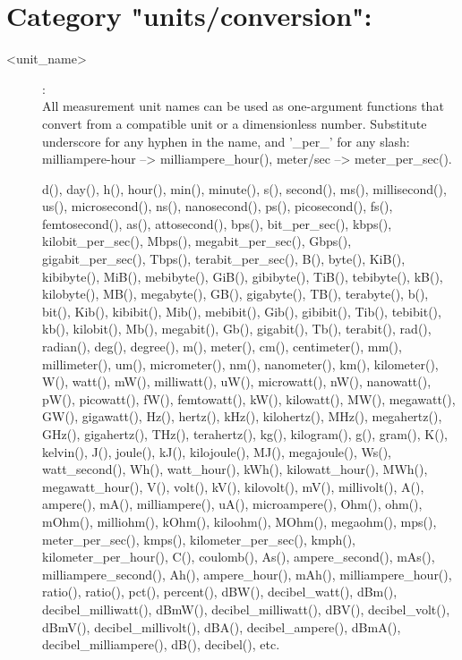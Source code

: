\section{Category "units/conversion":}
\label{sec:ned-functions:category-units-conversion}

\begin{description}
\item[<unit\_name>]:  \\
    All measurement unit names can be used as one-argument functions that
    convert from a compatible unit or a dimensionless number. Substitute
    underscore for any hyphen in the name, and '\_per\_' for any slash:
    milliampere-hour --> milliampere\_hour(), meter/sec --> meter\_per\_sec().

    d(), day(), h(), hour(), min(), minute(), s(), second(), ms(),
    millisecond(), us(), microsecond(), ns(), nanosecond(), ps(), picosecond(),
    fs(), femtosecond(), as(), attosecond(), bps(), bit\_per\_sec(), kbps(),
    kilobit\_per\_sec(), Mbps(), megabit\_per\_sec(), Gbps(), gigabit\_per\_sec(),
    Tbps(), terabit\_per\_sec(), B(), byte(), KiB(), kibibyte(), MiB(),
    mebibyte(), GiB(), gibibyte(), TiB(), tebibyte(), kB(), kilobyte(), MB(),
    megabyte(), GB(), gigabyte(), TB(), terabyte(), b(), bit(), Kib(),
    kibibit(), Mib(), mebibit(), Gib(), gibibit(), Tib(), tebibit(), kb(),
    kilobit(), Mb(), megabit(), Gb(), gigabit(), Tb(), terabit(), rad(),
    radian(), deg(), degree(), m(), meter(), cm(), centimeter(), mm(),
    millimeter(), um(), micrometer(), nm(), nanometer(), km(), kilometer(),
    W(), watt(), mW(), milliwatt(), uW(), microwatt(), nW(), nanowatt(), pW(),
    picowatt(), fW(), femtowatt(), kW(), kilowatt(), MW(), megawatt(), GW(),
    gigawatt(), Hz(), hertz(), kHz(), kilohertz(), MHz(), megahertz(), GHz(),
    gigahertz(), THz(), terahertz(), kg(), kilogram(), g(), gram(), K(),
    kelvin(), J(), joule(), kJ(), kilojoule(), MJ(), megajoule(), Ws(),
    watt\_second(), Wh(), watt\_hour(), kWh(), kilowatt\_hour(), MWh(),
    megawatt\_hour(), V(), volt(), kV(), kilovolt(), mV(), millivolt(), A(),
    ampere(), mA(), milliampere(), uA(), microampere(), Ohm(), ohm(), mOhm(),
    milliohm(), kOhm(), kiloohm(), MOhm(), megaohm(), mps(), meter\_per\_sec(),
    kmps(), kilometer\_per\_sec(), kmph(), kilometer\_per\_hour(), C(), coulomb(),
    As(), ampere\_second(), mAs(), milliampere\_second(), Ah(), ampere\_hour(),
    mAh(), milliampere\_hour(), ratio(), ratio(), pct(), percent(), dBW(),
    decibel\_watt(), dBm(), decibel\_milliwatt(), dBmW(), decibel\_milliwatt(),
    dBV(), decibel\_volt(), dBmV(), decibel\_millivolt(), dBA(),
    decibel\_ampere(), dBmA(), decibel\_milliampere(), dB(), decibel(), etc.
\end{description}

